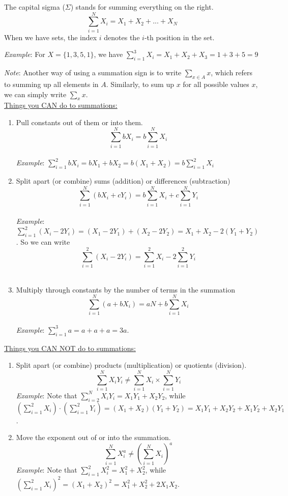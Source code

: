 \documentclass{./../../Latex/handout}
\begin{document}
\thispagestyle{plain}
\newcommand{\mytitle}{Summation Notation}
\myheader{\mytitle}

The capital sigma ($\Sigma$) stands for summing everything on the right. 
$$ \sum_{i=1}^N X_i = X_1 + X_2 + ... + X_N $$
When we have sets, the index $i$ denotes the $i$-th position in the set. 

\textit{Example}: For $X = \{1, 3, 5, 1\}$, we have $\sum_{i=1}^3 X_i = X_1 + X_2 + X_3 = 1 + 3 + 5 = 9$

\textit{Note}: Another way of using a summation sign is to write $\sum_{x \in A} x $, which refers to summing up all elements in $A$. Similarly, to sum up $x$ for all possible values $x$, we can simply write $\sum_x x$. \\


\underline{Things you CAN do to summations:}
\begin{enumerate}
\item Pull constants out of them or into them.
$$ \sum_{i=1}^N b X_i = b \sum_{i=1}^N X_i  $$ \\
\textit{Example}: $ \sum_{i=1}^2 b X_i = b X_1 + b X_2 = b(X_1 + X_2) = b \sum_{i=1}^2 X_i $ \\
\item Split apart (or combine) sums (addition) or differences (subtraction)
$$ \sum_{i=1}^N (b X_i + c Y_i) = b \sum_{i=1}^N X_i  + c \sum_{i=1}^N Y_i $$ \\
\textit{Example}: $\sum_{i=1}^2 (X_i - 2 Y_i) = (X_1-2 Y_1) + (X_2-2 Y_2) = X_1 + X_2 - 2(Y_1 + Y_2)$. So we can write $$\sum_{i=1}^2 (X_i - 2 Y_i) = \sum_{i=1}^2 X_i - 2 \sum_{i=1}^2 Y_i $$ \\
\item Multiply through constants by the number of terms in the summation
$$ \sum_{i=1}^N (a+b X_i)= aN + b \sum_{i=1}^N X_i  $$ \\
\textit{Example}: $\sum_{i=1}^3 a = a + a + a = 3a $. \\
\end{enumerate}

\underline{Things you CAN NOT do to summations:}
\begin{enumerate}
\item Split apart (or combine) products (multiplication) or quotients (division).
$$ \sum_{i=1}^N X_i Y_i \neq  \sum_{i=1}^N X_i \times \sum_{i=1}^N Y_i   $$
\textit{Example}: Note that $\sum_{i=2}^N X_i Y_i = X_1 Y_1 + X_2 Y_2 $, while $(\sum_{i=1}^2 X_i) \cdot (\sum_{i=1}^2 Y_i) = (X_1+X_2)(Y_1 + Y_2) = X_1 Y_1 + X_2 Y_2 + X_1 Y_2 + X_2 Y_1 $. \\

\item Move the exponent out of or into the summation.
$$ \sum_{i=1}^N X_i^a \neq  \left(\sum_{i=1}^N X_i\right)^a $$
\textit{Example}: Note that $\sum_{i=1}^2 X_i^2 =  X_1^2 + X_2 ^2$, while  $\left(\sum_{i=1}^2 X_i\right)^2 = (X_1 + X_2)^2 = X_1^2 + X_2 ^2 + 2X_1 X_2$. \\
\end{enumerate}
\end{document}
